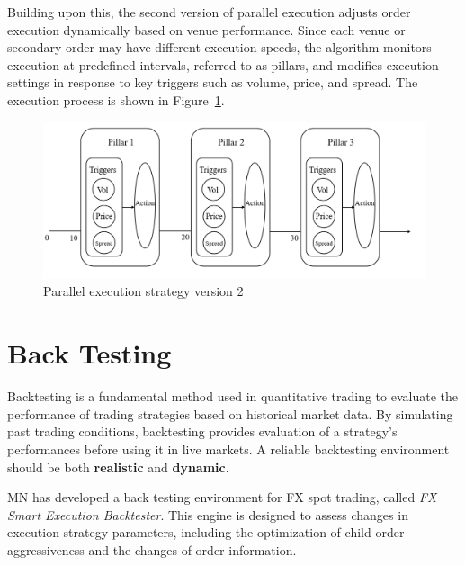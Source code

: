 Building upon this, the second version of parallel execution adjusts order execution dynamically based on venue performance. Since each venue or secondary order may have different execution speeds, the algorithm monitors execution at predefined intervals, referred to as pillars, and modifies execution settings in response to key triggers such as volume, price, and spread. The execution process is shown in Figure~\ref{fig:venue_submission_3}.
\begin{figure}[h]
    \centering
    \includegraphics[width=0.8\linewidth]{figures/venue_submission_3.png}
    \caption{Parallel execution strategy version 2}
    \label{fig:venue_submission_3}
\end{figure}



\section{Back Testing}
Backtesting is a fundamental method used in quantitative trading to evaluate the performance of trading strategies based on historical market data. By simulating past trading conditions, backtesting provides evaluation of a strategy's performances before using it in live markets. A reliable backtesting environment should be both \textbf{realistic} and \textbf{dynamic}.

MN has developed a back testing environment for FX spot trading, called \textit{FX Smart Execution Backtester}. This engine is designed to assess changes in execution strategy parameters, including the optimization of child order aggressiveness and the changes of order information. 

